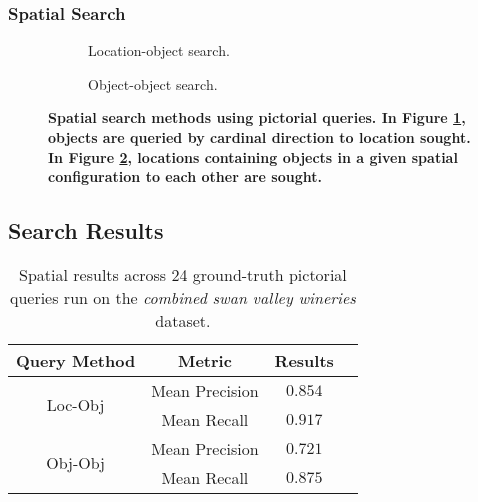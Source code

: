 \subsubsection{\textbf{Spatial Search}}


\begin{figure}[h]
    \centering
    \begin{subfigure}[t]{.2\textwidth}
        
        \caption{\small Location-object search.} 
        \label{fig:spatial_search_loc}
    \end{subfigure}
    \hfill
    \begin{subfigure}[t]{.2\textwidth}
        
        \caption{\small Object-object search.} 
        \label{fig:spatial_search_obj}
    \end{subfigure}
    \hfill
    \caption{\textbf{Spatial search methods using pictorial queries. In Figure \ref{fig:spatial_search_loc}, objects are queried by cardinal direction to location sought. In Figure \ref{fig:spatial_search_obj}, locations containing objects in a given spatial configuration to each other are sought.}}\label{figure:spatial_search} 
\end{figure}



\subsection{Search Results}

\small{
\begin{table}[h!]
    \begin{center}
        \begin{tabular}{ |c|c|c|c| } 
            \hline
            Query Method & Metric & Results \\
            \hline
            \multirow{2}{7em}{Loc-Obj} & Mean Precision & $0.854$ \\
            & Mean Recall & $0.917$\\%
            \hline     
            \multirow{2}{7em}{Obj-Obj} & Mean Precision & $0.721$ \\ 
            &Mean Recall & $0.875$ \\
            \hline
        \end{tabular}
        \caption{Spatial results across 24 ground-truth pictorial queries run on the \textit{combined swan valley wineries} dataset.} %
        \label{Table:GroundTruth}
    \end{center}
\end{table}
}


